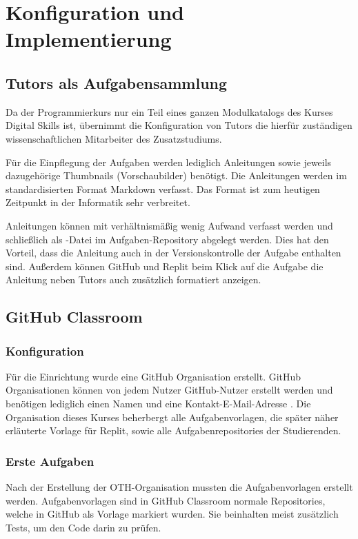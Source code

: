 \section{Konfiguration und Implementierung}\label{konfiguration-u-impl}

\subsection{Tutors als Aufgabensammlung}\label{tutors-als-aufgabensammlung}
Da der Programmierkurs nur ein Teil eines ganzen Modulkatalogs des Kurses
Digital Skills ist, übernimmt die Konfiguration von Tutors die hierfür
zuständigen wissenschaftlichen Mitarbeiter des Zusatzstudiums.

Für die Einpflegung der Aufgaben werden lediglich Anleitungen sowie
jeweils dazugehörige Thumbnails (Vorschaubilder) benötigt. Die Anleitungen
werden im standardisierten Format Markdown verfasst. Das Format ist zum heutigen
Zeitpunkt in der Informatik sehr verbreitet.

Anleitungen können mit verhältnismäßig wenig Aufwand verfasst werden und
schließlich als -Datei im Aufgaben-Repository abgelegt
werden. Dies hat den Vorteil, dass die Anleitung auch in der Versionskontrolle
der Aufgabe enthalten sind. Außerdem können GitHub und Replit beim Klick auf die
Aufgabe die Anleitung neben Tutors auch zusätzlich formatiert anzeigen.

\subsection{GitHub Classroom}\label{github-classroom}
\subsubsection{Konfiguration}\label{classroom-konfiguration}
Für die Einrichtung wurde eine GitHub Organisation erstellt. GitHub
Organisationen können von jedem Nutzer GitHub-Nutzer erstellt werden und
benötigen lediglich einen Namen und eine Kontakt-E-Mail-Adresse
\parencite{github-organisation-erstellen}. Die Organisation dieses Kurses beherbergt
alle Aufgabenvorlagen, die später näher erläuterte Vorlage für Replit, sowie
alle Aufgabenrepositories der Studierenden.

\subsubsection{Erste Aufgaben}\label{classroom-erste-aufgaben}
Nach der Erstellung der OTH-Organisation mussten die Aufgabenvorlagen erstellt
werden. Aufgabenvorlagen sind in GitHub Classroom normale Repositories, welche
in GitHub als Vorlage markiert wurden. Sie beinhalten meist zusätzlich Tests, um
den Code darin zu prüfen.


